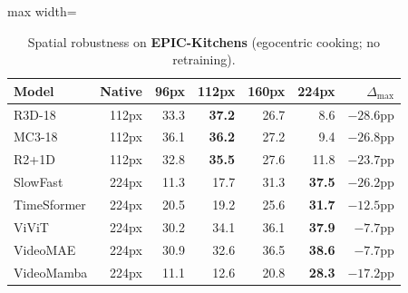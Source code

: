\documentclass[runningheads]{llncs}
\newcommand{\tabtight}{\setlength{\tabcolsep}{3.5pt}\renewcommand{\arraystretch}{1.12}}
\begin{document}
\begin{table}[!htbp]
\centering
\caption{Spatial robustness on \textbf{EPIC-Kitchens} (egocentric cooking; no retraining).}
\label{tab:sup_sp_epic}
\scriptsize\tabtight
\begin{adjustbox}{max width=\textwidth}
\begin{tabular}{l r rrrr r}
\toprule
Model & Native & 96px & 112px & 160px & 224px & $\Delta_\text{max}$ \\
\midrule
R3D-18      & 112px & 33.3 & \textbf{37.2} & 26.7 &  8.6 & $-28.6$pp \\
MC3-18      & 112px & 36.1 & \textbf{36.2} & 27.2 &  9.4 & $-26.8$pp \\
R2+1D       & 112px & 32.8 & \textbf{35.5} & 27.6 & 11.8 & $-23.7$pp \\
SlowFast    & 224px & 11.3 & 17.7 & 31.3 & \textbf{37.5} & $-26.2$pp \\
\midrule
TimeSformer & 224px & 20.5 & 19.2 & 25.6 & \textbf{31.7} & $-12.5$pp \\
ViViT       & 224px & 30.2 & 34.1 & 36.1 & \textbf{37.9} & $-7.7$pp \\
VideoMAE    & 224px & 30.9 & 32.6 & 36.5 & \textbf{38.6} & $-7.7$pp \\
VideoMamba  & 224px & 11.1 & 12.6 & 20.8 & \textbf{28.3} & $-17.2$pp \\
\bottomrule
\end{tabular}
\end{adjustbox}
\end{table}
\end{document}
